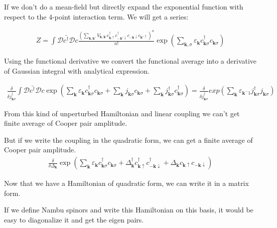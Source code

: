 \documentclass[14pt, a4paper]{extarticle}
\begin{document}
If we don't do a mean-field but directly expand the exponential function with respect to the 4-point interaction term. We will get a series:

\begin{align}
    Z = \int \mathcal{D} \bar{c^\dagger} \mathcal{D} c 
    \frac{\left(\sum_{\mathbf{k}, \mathbf{k'}} V_{\mathbf{k}, \mathbf{k'}} c_{\mathbf{k}\uparrow}^\dagger c_{-\mathbf{k'}\downarrow}^\dagger c_{-\mathbf{k}\downarrow} c_{\mathbf{k'}\uparrow}\right)^n}{n!} 
    \exp \left( \sum_{\mathbf{k}, \sigma} \varepsilon_{\mathbf{k}} c_{\mathbf{k}\sigma}^\dagger c_{\mathbf{k}\sigma} \right)
\end{align}

Using the functional derivative we convert the functional average into a derivative of Gaussian integral with analytical expression.

\begin{align}
    \frac{\delta}{\delta \bar{j_{\mathbf{k}\sigma}^\dagger}} \int \mathcal{D} \bar{c^\dagger} \mathcal{D} c \exp \left( \sum_{\mathbf{k}} \varepsilon_{\mathbf{k}} c_{\mathbf{k}\sigma}^\dagger c_{\mathbf{k}\sigma} + \sum_{\mathbf{k}} j_{\mathbf{k}\sigma} c_{\mathbf{k}\sigma} + \sum_{\mathbf{k}} j_{\mathbf{k}\sigma}^\dagger c_{\mathbf{k}\sigma}^\dagger \right) 
    =
    \frac{\delta}{\delta \bar{j_{\mathbf{k}\sigma}^\dagger}} exp \left( \sum_{\mathbf{k}} \varepsilon_{\mathbf{k}^-1} j_{\mathbf{k}\sigma}^\dagger j_{\mathbf{k}\sigma} \right)
\end{align}

From this kind of unperturbed Hamiltonian and linear coupling we can't get finite average of Cooper pair amplitude.

But if we write the coupling in the quadratic form, we can get a finite average of Cooper pair amplitude.
\begin{align}
    \frac{\delta}{\delta \Delta_{\mathbf{k}}} 
    \exp 
    \left( 
        \sum_{\mathbf{k}}
        \varepsilon_{\mathbf{k}} c_{\mathbf{k}\sigma}^\dagger c_{\mathbf{k}\sigma} +
        \Delta_{\mathbf{k}}^\dagger c_{\mathbf{k}\uparrow}^\dagger c_{-\mathbf{k}\downarrow}^\dagger +
        \Delta_{\mathbf{k}} c_{\mathbf{k}\uparrow} c_{-\mathbf{k}\downarrow} 
        \right)
\end{align}





Now that we have a Hamiltonian of quadratic form, we can write it in a matrix form.

If we define Nambu spinors and write this Hamiltonian on this basis, it would be easy to diagonalize it and get the eigen pairs.
\end{document}
